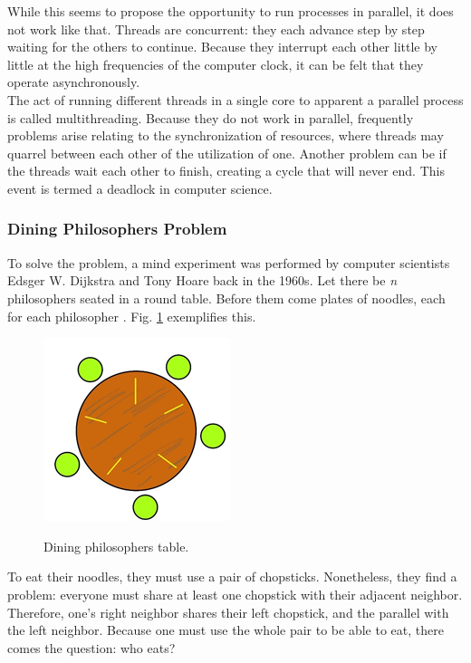\documentclass[12pt]{article}
\begin{document}
While this seems to propose the opportunity to run processes in parallel, it does not work like that. Threads are concurrent: they each advance step by step waiting for the others to continue. Because they interrupt each other little by little at the high frequencies of the computer clock, it can be felt that they operate asynchronously. \\

The act of running different threads in a single core to apparent a parallel process is called multithreading. Because they do not work in parallel, frequently problems arise relating to the synchronization of resources, where threads may quarrel between each other of the utilization of one. Another problem can be if the threads wait each other to finish, creating a cycle that will never end. This event is termed a deadlock in computer science. \\

\subsubsection{Dining Philosophers Problem}

To solve the problem, a mind experiment was performed by computer scientists Edsger W. Dijkstra and Tony Hoare back in the 1960s. Let there be \emph{n} philosophers seated in a round table. Before them come plates of noodles, each for each philosopher \cite{osbook}. Fig. \ref{fig:2} exemplifies this. \\

\begin{figure}[h]
\includegraphics{phil}
\label{fig:2}
\centering
\caption{Dining philosophers table.}
\end{figure}

To eat their noodles, they must use a pair of chopsticks. Nonetheless, they find a problem: everyone must share at least one chopstick with their adjacent neighbor. Therefore, one’s right neighbor shares their left chopstick, and the parallel with the left neighbor. Because one must use the whole pair to be able to eat, there comes the question: who eats? \\
\end{document}
